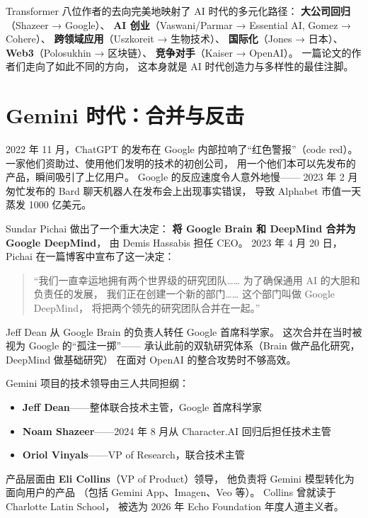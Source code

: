 \begin{keybox}
Transformer 八位作者的去向完美地映射了 AI 时代的多元化路径：
\textbf{大公司回归}（Shazeer → Google）、
\textbf{AI 创业}（Vaswani/Parmar → Essential AI, Gomez → Cohere）、
\textbf{跨领域应用}（Uszkoreit → 生物技术）、
\textbf{国际化}（Jones → 日本）、
\textbf{Web3}（Polosukhin → 区块链）、
\textbf{竞争对手}（Kaiser → OpenAI）。
一篇论文的作者们走向了如此不同的方向，
这本身就是 AI 时代创造力与多样性的最佳注脚。
\end{keybox}


\section{Gemini 时代：合并与反击}
\label{sec:gemini}

2022 年 11 月，ChatGPT 的发布在 Google 内部拉响了``红色警报''（code red）。
一家他们资助过、使用他们发明的技术的初创公司，
用一个他们本可以先发布的产品，瞬间吸引了上亿用户。
Google 的反应速度令人意外地慢——
2023 年 2 月匆忙发布的 Bard 聊天机器人在发布会上出现事实错误，
导致 Alphabet 市值一天蒸发 1000 亿美元。

Sundar Pichai 做出了一个重大决定：
\textbf{将 Google Brain 和 DeepMind 合并为 Google DeepMind}，
由 Demis Hassabis 担任 CEO。
2023 年 4 月 20 日，Pichai 在一篇博客中宣布了这一决定：

\begin{quote}
``我们一直幸运地拥有两个世界级的研究团队……
为了确保通用 AI 的大胆和负责任的发展，
我们正在创建一个新的部门……
这个部门叫做 Google DeepMind，
将把两个领先的研究团队合并在一起。''
\end{quote}

Jeff Dean 从 Google Brain 的负责人转任 Google 首席科学家。
这次合并在当时被视为 Google 的``孤注一掷''——
承认此前的双轨研究体系（Brain 做产品化研究，DeepMind 做基础研究）
在面对 OpenAI 的整合攻势时不够高效。

\begin{corebox}
Gemini 项目的技术领导由三人共同担纲：
\begin{itemize}[noitemsep]
  \item \textbf{Jeff Dean}——整体联合技术主管，Google 首席科学家
  \item \textbf{Noam Shazeer}——2024 年 8 月从 Character.AI 回归后担任技术主管
  \item \textbf{Oriol Vinyals}——VP of Research，联合技术主管
\end{itemize}
产品层面由 \textbf{Eli Collins}（VP of Product）领导，
他负责将 Gemini 模型转化为面向用户的产品
（包括 Gemini App、Imagen、Veo 等）。
Collins 曾就读于 Charlotte Latin School，
被选为 2026 年 Echo Foundation 年度人道主义者。
\end{corebox}

